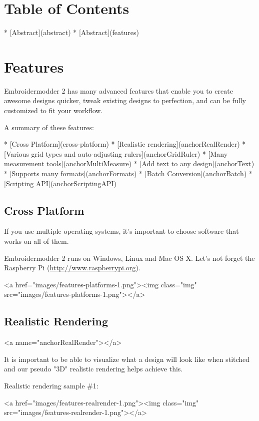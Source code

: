 \documentclass[a4paper, 11pt]{report}
\begin{document}
\section{Table of Contents}

* [Abstract](abstract)
* [Abstract](features)

\section{Features}

Embroidermodder 2 has many advanced features that enable you to create awesome designs quicker, tweak existing designs to perfection, and can be fully customized to fit your workflow.

A summary of these features:

* [Cross Platform](cross-platform)
* [Realistic rendering](anchorRealRender)
* [Various grid types and auto-adjusting rulers](anchorGridRuler)
* [Many measurement tools](anchorMultiMeasure)
* [Add text to any design](anchorText)
* [Supports many formats](anchorFormats)
* [Batch Conversion](anchorBatch)
* [Scripting API](anchorScriptingAPI)

\subsection{Cross Platform}

If you use multiple operating systems, it's important to choose software that works on all of them.

Embroidermodder 2 runs on Windows, Linux and Mac OS X. Let's not forget the Raspberry Pi (\url{http://www.raspberrypi.org}).

<a href="images/features-platforms-1.png"><img class="img" src="images/features-platforms-1.png"></a>

\subsection{Realistic Rendering}

<a name="anchorRealRender"></a>

It is important to be able to visualize what a design will look like when stitched and our pseudo "3D" realistic rendering helps achieve this.

Realistic rendering sample \#1:

<a href="images/features-realrender-1.png"><img class="img" src="images/features-realrender-1.png"></a>
\end{document}
